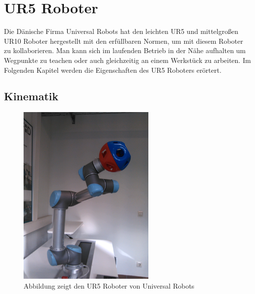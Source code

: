 \section{UR5 Roboter}
\label{sec:ur_robot_gru}

Die Dänische Firma Universal Robots hat den leichten UR5 und mittelgroßen UR10 Roboter hergestellt mit den erfüllbaren Normen, um mit diesem Roboter zu kollaborieren. Man kann sich im laufenden Betrieb in der Nähe aufhalten um Wegpunkte zu \ac{teachen} oder auch gleichzeitig an einem Werkstück zu arbeiten.
Im Folgenden Kapitel werden die Eigenschaften des UR5 Roboters erörtert.

\subsection{Kinematik}
\label{ur_eigenschaften_gru}

\begin{figure}[H]
  \centering
    \includegraphics[width=0.6\textwidth]{pic/ur5_robot.jpg}
      \caption[UR5 Roboter]{Abbildung zeigt den UR5 Roboter von Universal Robots}
      \label{fig:schnittstellen_schichten}
\end{figure}

